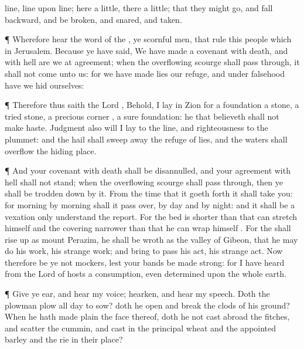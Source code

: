 {line,
line upon
line; here a
little,
{} there a
little; that they might
go, and
fall
backward, and be
broken, and
snared, and
taken.
\par }{\PP {}¶ Wherefore
hear the
word of the
{}, ye
scornful
men, that
rule this
people which
{} in
Jerusalem.
Because ye have
said, We have
made a
covenant with
death, and with
hell are
we at
agreement; when the
overflowing
scourge shall pass
through, it shall not
come unto us: for we have
made
lies our
refuge, and under
falsehood have we
hid ourselves:
\par }{\PP {}¶ Therefore thus
saith the
Lord
{}, Behold, I
lay in
Zion for a foundation a
stone, a
tried
stone, a
precious
corner
{}, a
sure
foundation: he that
believeth shall not make
haste.
Judgment also will I
lay to the
line, and
righteousness to the
plummet: and the
hail shall sweep
away the
refuge of
lies, and the
waters shall
overflow the hiding
place.
\par }{\PP {}¶ And your
covenant with
death shall be
disannulled, and your
agreement with
hell shall not
stand; when the
overflowing
scourge shall pass
through, then ye shall be trodden
down by it.
From the
time that it goeth
forth it shall
take you: for
morning by
morning shall it pass
over, by
day and by
night: and it shall be a
vexation only
{}
understand the
report.
For the
bed is
shorter than that
{} can
stretch himself
{} and the
covering
narrower than that he can
wrap himself
{}.
For the
{} shall rise
up as
{}
mount
Perazim, he shall be
wroth as
{} the
valley of
Gibeon, that he may
do his
work, his
strange
work; and bring to
pass his
act, his
strange
act.
Now therefore be ye not
mockers, lest your
bands be made
strong: for I have
heard from the
Lord
{} of
hosts a
consumption, even
determined upon the whole
earth.
\par }{\PP {}¶ Give ye
ear, and
hear my
voice;
hearken, and
hear my
speech.
Doth the
plowman
plow all
day to
sow? doth he
open and break the
clods of his
ground?
When he hath made
plain the
face thereof, doth he not cast
abroad the
fitches, and
scatter the
cummin, and
cast in the
principal
wheat and the
appointed
barley and the
rie in their
place?}
